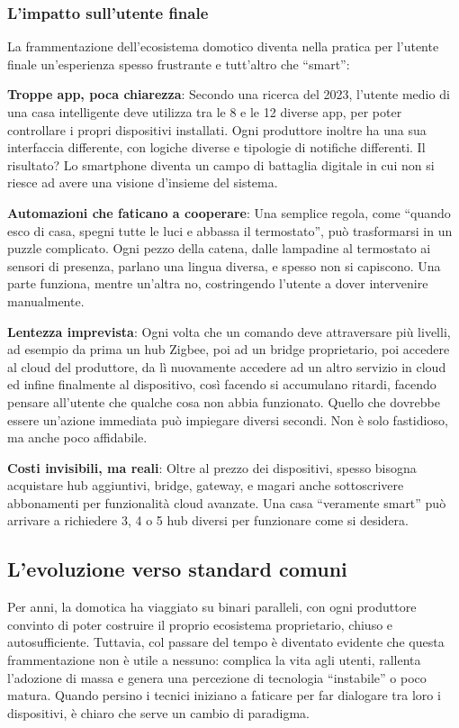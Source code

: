 \subsubsection{L'impatto sull'utente finale}

La frammentazione dell’ecosistema domotico diventa nella pratica per l’utente finale un’esperienza spesso frustrante e tutt’altro che “smart”:

\textbf{Troppe app, poca chiarezza}: Secondo una ricerca del 2023, l’utente medio di una casa intelligente deve utilizza tra le 8 e le 12 diverse app, per poter controllare i propri dispositivi installati. Ogni produttore inoltre ha una sua interfaccia differente, con logiche diverse e tipologie di notifiche differenti. Il risultato? Lo smartphone diventa un campo di battaglia digitale in cui non si riesce ad avere una visione d’insieme del sistema.

\textbf{Automazioni che faticano a cooperare}: Una semplice regola, come “quando esco di casa, spegni tutte le luci e abbassa il termostato”, può trasformarsi in un puzzle complicato. Ogni pezzo della catena, dalle lampadine al termostato ai sensori di presenza, parlano una lingua diversa, e spesso non si capiscono. Una parte funziona, mentre un'altra no, costringendo l’utente a dover intervenire manualmente.

\textbf{Lentezza imprevista}: Ogni volta che un comando deve attraversare più livelli, ad esempio da prima un hub Zigbee, poi ad un bridge proprietario, poi accedere al cloud del produttore, da lì nuovamente accedere ad un altro servizio in cloud ed infine finalmente al dispositivo, così facendo si accumulano ritardi, facendo pensare all'utente che qualche cosa non abbia funzionato. Quello che dovrebbe essere un’azione immediata può impiegare diversi secondi. Non è solo fastidioso, ma anche poco affidabile.

\textbf{Costi invisibili, ma reali}: Oltre al prezzo dei dispositivi, spesso bisogna acquistare hub aggiuntivi, bridge, gateway, e magari anche sottoscrivere abbonamenti per funzionalità cloud avanzate. Una casa “veramente smart” può arrivare a richiedere 3, 4 o 5 hub diversi per funzionare come si desidera.

\subsection{L'evoluzione verso standard comuni}

Per anni, la domotica ha viaggiato su binari paralleli, con ogni produttore convinto di poter costruire il proprio ecosistema proprietario, chiuso e autosufficiente. Tuttavia, col passare del tempo è diventato evidente che questa frammentazione non è utile a nessuno: complica la vita agli utenti, rallenta l’adozione di massa e genera una percezione di tecnologia “instabile” o poco matura. Quando persino i tecnici iniziano a faticare per far dialogare tra loro i dispositivi, è chiaro che serve un cambio di paradigma.

